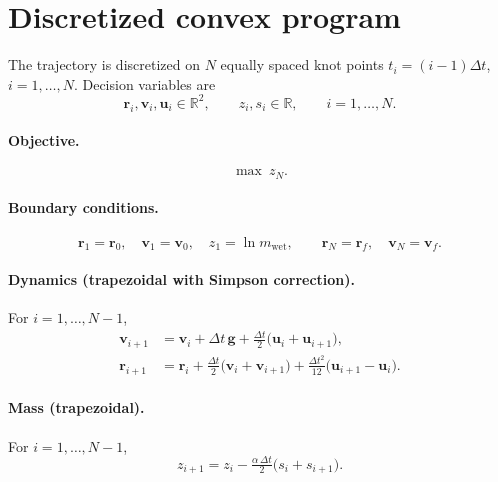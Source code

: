 \documentclass[11pt]{article}
\newcommand{\bv}[1]{\bm{#1}}
\begin{document}
\section{Discretized convex program}
\label{sec:discrete}

The trajectory is discretized on $N$ equally spaced knot points
$t_i=(i-1)\Delta t$, $i=1,\dots,N$.  Decision variables are
\[
\bv r_i,\bv v_i,\bv u_i\in\mathbb{R}^2,\qquad
z_i,s_i\in\mathbb{R},\qquad i=1,\dots,N.
\]

\paragraph{Objective.}
\begin{equation}
\max\ z_N .
\end{equation}

\paragraph{Boundary conditions.}
\begin{equation}
\bv r_1=\bv r_0,\quad \bv v_1=\bv v_0,\quad z_1=\ln m_{\text{wet}},
\qquad
\bv r_N=\bv r_f,\quad \bv v_N=\bv v_f .
\end{equation}

\paragraph{Dynamics (trapezoidal with Simpson correction).}
For $i=1,\dots,N-1$,
\begin{align}
\bv v_{i+1} &= \bv v_i + \Delta t\,\bv g
               + \tfrac{\Delta t}{2}\bigl(\bv u_i+\bv u_{i+1}\bigr),
\label{eq:disc_v}\\
\bv r_{i+1} &= \bv r_i + \tfrac{\Delta t}{2}\bigl(\bv v_i+\bv v_{i+1}\bigr)
               + \tfrac{\Delta t^2}{12}\bigl(\bv u_{i+1}-\bv u_i\bigr) .
\label{eq:disc_r}
\end{align}

\paragraph{Mass (trapezoidal).}
For $i=1,\dots,N-1$,
\begin{equation}
z_{i+1} = z_i - \tfrac{\alpha\,\Delta t}{2}\bigl(s_i+s_{i+1}\bigr) .
\label{eq:disc_z}
\end{equation}
\end{document}
